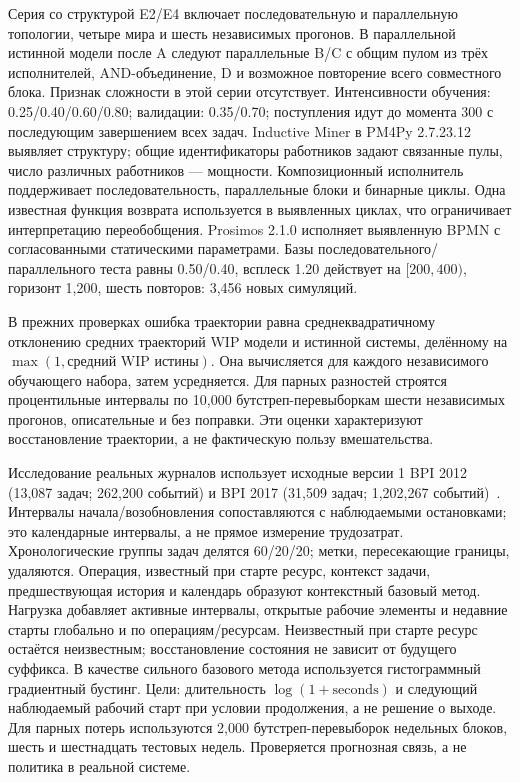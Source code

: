 \documentclass[runningheads]{llncs}
\begin{document}
Серия со структурой E2/E4 включает последовательную и параллельную топологии, четыре мира и шесть независимых прогонов. В параллельной истинной модели после A следуют параллельные B/C с общим пулом из трёх исполнителей, AND-объединение, D и возможное повторение всего совместного блока. Признак сложности в этой серии отсутствует. Интенсивности обучения: 0.25/0.40/0.60/0.80; валидации: 0.35/0.70; поступления идут до момента 300 с последующим завершением всех задач. Inductive Miner в PM4Py 2.7.23.12 выявляет структуру; общие идентификаторы работников задают связанные пулы, число различных работников --- мощности. Композиционный исполнитель поддерживает последовательность, параллельные блоки и бинарные циклы. Одна известная функция возврата используется в выявленных циклах, что ограничивает интерпретацию переобобщения. Prosimos 2.1.0 исполняет выявленную BPMN с согласованными статическими параметрами. Базы последовательного/параллельного теста равны 0.50/0.40, всплеск 1.20 действует на $[200,400)$, горизонт 1,200, шесть повторов: 3,456 новых симуляций.

В прежних проверках ошибка траектории равна среднеквадратичному отклонению средних траекторий WIP модели и истинной системы, делённому на $\max(1,\text{средний WIP истины})$. Она вычисляется для каждого независимого обучающего набора, затем усредняется. Для парных разностей строятся процентильные интервалы по 10,000 бутстреп-перевыборкам шести независимых прогонов, описательные и без поправки. Эти оценки характеризуют восстановление траектории, а не фактическую пользу вмешательства.

Исследование реальных журналов использует исходные версии 1 BPI 2012 (13,087 задач; 262,200 событий) и BPI 2017 (31,509 задач; 1,202,267 событий)~\cite{bpi12,bpi17}. Интервалы начала/возобновления сопоставляются с наблюдаемыми остановками; это календарные интервалы, а не прямое измерение трудозатрат. Хронологические группы задач делятся 60/20/20; метки, пересекающие границы, удаляются. Операция, известный при старте ресурс, контекст задачи, предшествующая история и календарь образуют контекстный базовый метод. Нагрузка добавляет активные интервалы, открытые рабочие элементы и недавние старты глобально и по операциям/ресурсам. Неизвестный при старте ресурс остаётся неизвестным; восстановление состояния не зависит от будущего суффикса. В качестве сильного базового метода используется гистограммный градиентный бустинг. Цели: длительность $\log(1+\mathrm{seconds})$ и следующий наблюдаемый рабочий старт при условии продолжения, а не решение о выходе. Для парных потерь используются 2,000 бутстреп-перевыборок недельных блоков, шесть и шестнадцать тестовых недель. Проверяется прогнозная связь, а не политика в реальной системе.
\end{document}
